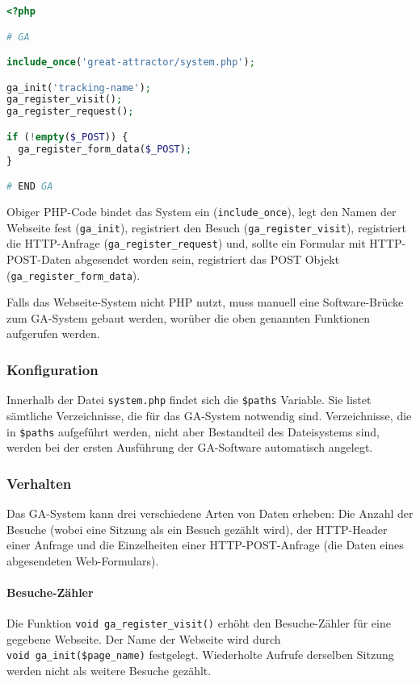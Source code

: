 \begin{lstlisting}[language=PHP]
<?php

# GA

include_once('great-attractor/system.php');

ga_init('tracking-name');
ga_register_visit();
ga_register_request();

if (!empty($_POST)) {
  ga_register_form_data($_POST);
}

# END GA
\end{lstlisting}

Obiger PHP-Code bindet das System ein (\texttt{include\_once}), legt den Namen
der Webseite fest (\texttt{ga\_init}), registriert den Besuch
(\texttt{ga\_register\_visit}), registriert die HTTP-Anfrage
(\texttt{ga\_register\_request}) und, sollte ein Formular mit HTTP-POST-Daten
abgesendet worden sein, registriert das POST Objekt
(\texttt{ga\_register\_form\_data}).

Falls das Webseite-System nicht PHP nutzt, muss manuell eine Software-Brücke
zum GA-System gebaut werden, worüber die oben genannten Funktionen aufgerufen
werden.

\subsubsection{Konfiguration}
\label{ssub:ga_konfiguration}
Innerhalb der Datei \texttt{system.php} findet sich die \texttt{\$paths}
Variable. Sie listet sämtliche Verzeichnisse, die für das GA-System notwendig
sind. Verzeichnisse, die in \texttt{\$paths} aufgeführt werden, nicht aber
Bestandteil des Dateisystems sind, werden bei der ersten Ausführung der
GA-Software automatisch angelegt.

\subsubsection{Verhalten}
\label{ssub:verhalten}
Das GA-System kann drei verschiedene Arten von Daten erheben: Die Anzahl der
Besuche (wobei eine Sitzung als ein Besuch gezählt wird), der HTTP-Header einer
Anfrage und die Einzelheiten einer HTTP-POST-Anfrage (die Daten eines
abgesendeten Web-Formulars).

\paragraph{Besuche-Zähler}
\label{par:ga_besuche_zahler}
Die Funktion \texttt{void\ ga\_register\_visit()} erhöht den Besuche-Zähler für
eine gegebene Webseite. Der Name der Webseite wird durch \texttt{void\
ga\_init(\$page\_name)} festgelegt. Wiederholte Aufrufe derselben Sitzung
werden nicht als weitere Besuche gezählt.


